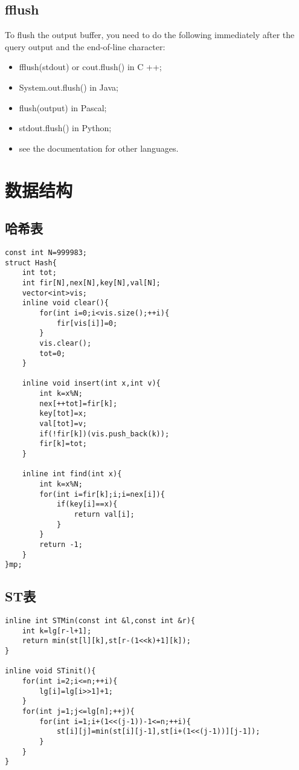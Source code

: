 \documentclass{ctexart}
\begin{document}
\subsection{fflush}
To flush the output buffer, you need to do the following immediately after the query output and the end-of-line character:
\begin{itemize}
    \item fflush(stdout) or cout.flush() in C ++;
    \item System.out.flush() in Java;
    \item flush(output) in Pascal;
    \item stdout.flush() in Python;
    \item see the documentation for other languages.
\end{itemize}
\section{数据结构}
\subsection{哈希表}
\begin{lstlisting}
const int N=999983;
struct Hash{
    int tot;
    int fir[N],nex[N],key[N],val[N];
    vector<int>vis;
    inline void clear(){
        for(int i=0;i<vis.size();++i){
            fir[vis[i]]=0;
        }
        vis.clear();
        tot=0;
    }

    inline void insert(int x,int v){
        int k=x%N;
        nex[++tot]=fir[k];
        key[tot]=x;
        val[tot]=v;
        if(!fir[k])(vis.push_back(k));
        fir[k]=tot;
    }

    inline int find(int x){
        int k=x%N;
        for(int i=fir[k];i;i=nex[i]){
            if(key[i]==x){
                return val[i];
            }
        }
        return -1;
    }
}mp;
\end{lstlisting}
\subsection{ST表}
\begin{lstlisting}
inline int STMin(const int &l,const int &r){
    int k=lg[r-l+1];
    return min(st[l][k],st[r-(1<<k)+1][k]);
}

inline void STinit(){
    for(int i=2;i<=n;++i){
        lg[i]=lg[i>>1]+1;
    }
    for(int j=1;j<=lg[n];++j){
        for(int i=1;i+(1<<(j-1))-1<=n;++i){
            st[i][j]=min(st[i][j-1],st[i+(1<<(j-1))][j-1]);
        }
    }
}
\end{lstlisting}
\end{document}

